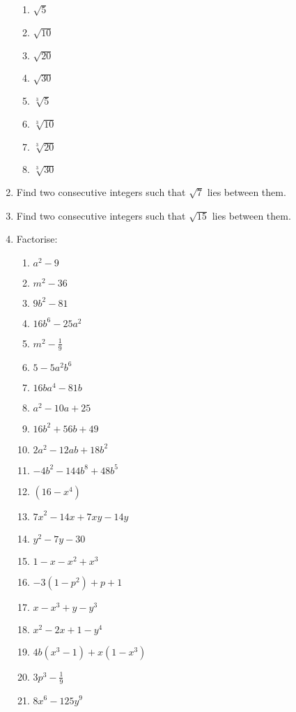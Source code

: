 \begin{eocexercises}{}
\begin{enumerate}[itemsep=5pt, label=\textbf{\arabic*}. ]
\begin{multicols}{2}
    \begin{enumerate}[itemsep=0pt, label=\textbf{(\alph*)} ] 
    \item $\sqrt{5}$ 
    \item $\sqrt{10}$ 
    \item $\sqrt{20}$ 
    \item $\sqrt{30}$ 
    \item $\sqrt[3]{5}$ 
    \item $\sqrt[3]{10}$ 
    \item $\sqrt[3]{20}$ 
    \item $\sqrt[3]{30}$ 
    \end{enumerate}
\end{multicols}
\item  Find two consecutive integers such that $\sqrt{7}$ lies between them.          
\item  Find two consecutive integers such that $\sqrt{15}$ lies between them.          
\item Factorise:
\begin{multicols}{2}
\begin{enumerate}[itemsep=2pt, label=\textbf{(\alph*)} ] 
\item ${a}^{2}-9$
\item ${m}^{2}-36$
\item $9{b}^{2}-81$
\item $16{b}^{6}-25{a}^{2}$
\item ${m}^{2}-\frac{1}{9}$
\item $5-5{a}^{2}{b}^{6}$
\item $16b{a}^{4}-81b$
\item ${a}^{2}-10a+25$
\item $16{b}^{2}+56b+49$
\item $2{a}^{2}-12ab+18{b}^{2}$
\item $-4{b}^{2}-144{b}^{8}+48{b}^{5}$
\item $(16-{x}^{4})$
\item ${7x}^{2}-14x+7xy-14y$
\item ${y}^{2}-7y-30$
\item $1-x-{x}^{2}+{x}^{3}$
\item $-3(1-{p}^{2})+p+1$
\item $x-x^{3} + y - y^{3}$
\item $x^{2} - 2x + 1 - y^{4}$
\item $4b(x^{3} - 1) + x(1-x^{3})$
\item $3p^{3} - \frac{1}{9}$
\item $8x^6-125y^9$

\end{enumerate}
\end{multicols}
\end{enumerate}
\end{eocexercises}
